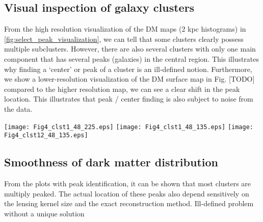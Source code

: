 \subsection{Visual inspection of galaxy clusters}
From the high resolution visualization of the DM maps (2 kpc histograms) in 
\ref{fig:select_peak_visualization}, we can tell that some clusters clearly
possess multiple subclusters. However, there are also several clusters with
only one main component that has several peaks (galaxies) in the central region. 
This illustrates why finding a `center' or peak of a cluster is an ill-defined 
notion. Furthermore, we show a lower-resolution visualization of the DM surface
map in Fig. [TODO] compared to the higher resolution map, we can see a clear
shift in the peak location. This illustrates that peak / center finding is also
subject to noise from the data.


\begin{figure*}
	\begin{center}
	\texttt{[image: Fig4\_clst1\_48\_225.eps]}
	\texttt{[image: Fig4\_clst1\_48\_135.eps]}
	\texttt{[image: Fig4\_clst12\_48\_135.eps]}
	\caption{ Visualization of clusters (each row is for the same projection
		of the same cluster). {\bf Left column:} Projected density distribution of DM	
		particle data (density overlay). 
		The identified density peaks are indicated by colored circles. 
		{\bf Middle column:} The same DM projection but with treated with a 50 
		kpc smoothing kernel (kernel size indicated by white dot on lower right of the figure.) 
		{\bf Right column:} Projected galaxy kernel density estimates (KDE) of 
		the $i$-band luminosity map for the member
		galaxies of the same clusters. See \href{http://goo.gl/WiDijQ}{http://goo.gl/WiDijQ} 
		and \href{http://goo.gl/89edcM}{http://goo.gl/89edcM} for the visualization 
		of the selected
		clusters inside two Jupyter notebooks.
		\label{fig:select_peak_visualization}
	}
\end{center}
\end{figure*}

\subsection{Smoothness of dark matter distribution}
From the plots with peak identification, it can be shown that most clusters are
multiply peaked. The actual location of these peaks also depend sensitively 
on the lensing kernel size and the exact reconstruction method.  
Ill-defined problem without a unique solution 

